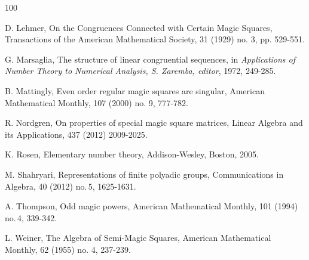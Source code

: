 \documentclass[11pt]{article}
\theoremstyle{plain}
\theoremstyle{definition}
\newcommand{\+}[1]{{#1}^\times}
\begin{document}
{\begin{thebibliography}{100}

 D. Lehmer, On the Congruences Connected with Certain Magic Squares, Transactions of the American Mathematical Society, 31 (1929) no. 3, pp. 529-551.

 G. Marsaglia, The structure of linear congruential sequences, in {\it Applications of Number Theory to Numerical Analysis, S. Zaremba, editor}, 1972, 249-285. 

 B. Mattingly, Even order regular magic squares are singular, American Mathematical Monthly, 107 (2000) no. 9, 777-782.


 R. Nordgren, On properties of special magic square matrices, Linear Algebra and its Applications, 437 (2012) 2009-2025.


 K. Rosen, Elementary number theory, Addison-Wesley, Boston, 2005. 

 M. Shahryari, Representations of finite polyadic groups, Communications in Algebra, 40 (2012) no.\,5, 1625-1631.

 A. Thompson, Odd magic powers, American Mathematical Monthly, 101 (1994) no.\,4, 339-342.

 L. Weiner, The Algebra of Semi-Magic Squares, American Mathematical Monthly, 62 (1955) no. 4, 237-239.


\end{thebibliography}
}
\end{document}

